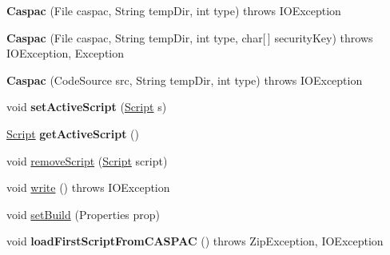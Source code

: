 \begin{DoxyCompactItemize}
\item 
\hypertarget{classCASUAL_1_1caspac_1_1Caspac_ab38e5cbb99b6d16f213340e9e61e74be}{{\bfseries Caspac} (File caspac, String temp\-Dir, int type)  throws I\-O\-Exception }\label{classCASUAL_1_1caspac_1_1Caspac_ab38e5cbb99b6d16f213340e9e61e74be}

\item 
\hypertarget{classCASUAL_1_1caspac_1_1Caspac_a5e48084a2dab585c35cbbfaa4fa9d930}{{\bfseries Caspac} (File caspac, String temp\-Dir, int type, char\mbox{[}$\,$\mbox{]} security\-Key)  throws I\-O\-Exception, Exception }\label{classCASUAL_1_1caspac_1_1Caspac_a5e48084a2dab585c35cbbfaa4fa9d930}

\item 
\hypertarget{classCASUAL_1_1caspac_1_1Caspac_add729e52bae97e76abb6274c966d0cef}{{\bfseries Caspac} (Code\-Source src, String temp\-Dir, int type)  throws I\-O\-Exception }\label{classCASUAL_1_1caspac_1_1Caspac_add729e52bae97e76abb6274c966d0cef}

\item 
\hypertarget{classCASUAL_1_1caspac_1_1Caspac_a0d0048140cf666e0a8d160f113a12b4a}{void {\bfseries set\-Active\-Script} (\hyperlink{classCASUAL_1_1caspac_1_1Script}{Script} s)}\label{classCASUAL_1_1caspac_1_1Caspac_a0d0048140cf666e0a8d160f113a12b4a}

\item 
\hypertarget{classCASUAL_1_1caspac_1_1Caspac_acb6c1d1e3d6d4e69930a0eeba2be3326}{\hyperlink{classCASUAL_1_1caspac_1_1Script}{Script} {\bfseries get\-Active\-Script} ()}\label{classCASUAL_1_1caspac_1_1Caspac_acb6c1d1e3d6d4e69930a0eeba2be3326}

\item 
void \hyperlink{classCASUAL_1_1caspac_1_1Caspac_a6368289098354e4d854ed665eb956dbe}{remove\-Script} (\hyperlink{classCASUAL_1_1caspac_1_1Script}{Script} script)
\item 
void \hyperlink{classCASUAL_1_1caspac_1_1Caspac_a872aa569a507a588786ad590b1a66d3b}{write} ()  throws I\-O\-Exception 
\item 
void \hyperlink{classCASUAL_1_1caspac_1_1Caspac_a9bbcc820fc5af56dd7e2a45908db30e6}{set\-Build} (Properties prop)
\item 
\hypertarget{classCASUAL_1_1caspac_1_1Caspac_ae8e8c0ace3ecbbfad7d731965c73288a}{void {\bfseries load\-First\-Script\-From\-C\-A\-S\-P\-A\-C} ()  throws Zip\-Exception, I\-O\-Exception }\label{classCASUAL_1_1caspac_1_1Caspac_ae8e8c0ace3ecbbfad7d731965c73288a}


\end{DoxyCompactItemize}

